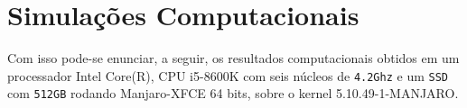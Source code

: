 \documentclass[a4paper,12pt]{report}
\theoremstyle{plain}
\theoremstyle{definition}
\begin{document}
	
	\section{Simulações Computacionais}
	
	Com isso pode-se enunciar, a seguir, os resultados computacionais obtidos em um processador Intel Core(R), CPU i5-8600K com seis núcleos de \texttt{4.2Ghz} e um \texttt{SSD} com \texttt{512GB} rodando Manjaro-XFCE 64 bits, sobre o kernel 5.10.49-1-MANJARO.
\end{document}
